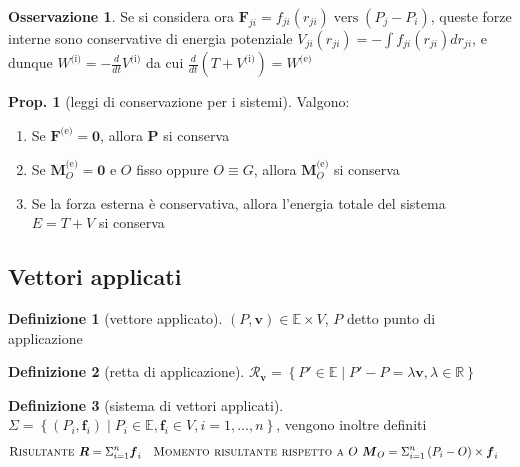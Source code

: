 \documentclass[a4paper,10pt]{article}
\theoremstyle{definition}
\DeclareMathOperator*{\vers}{vers}
\theoremstyle{indentdefinition}
\newtheorem{defn}{Definizione}[section]
\theoremstyle{indenttheorem}
\newtheorem{prop}{Prop.}
\theoremstyle{myremark}
\newtheorem*{rem*}{Osservazione}
\theoremstyle{indentgeneral}
\begin{document}
\begin{rem*}
Se si considera ora $\boldsymbol{F}_{ji}=f_{ji}\left(r_{ji}\right)\vers\left(P_{j}-P_{i}\right)$,
queste forze interne sono conservative di energia potenziale $V_{ji}\left(r_{ji}\right)=-\int f_{ji}\left(r_{ji}\right)dr_{ji}$,
e dunque $W^{\text{(i)}}=-\frac{d}{dt}V^{\text{(i)}}$ da cui $\frac{d}{dt}\left(T+V^{\text{(i)}}\right)=W^{\text{(e)}}$
\end{rem*}
\begin{prop}[leggi di conservazione per i sistemi]
\label{prop:leggi-conservazione-sistemi}Valgono:
\end{prop}

\begin{enumerate}
\item Se $\boldsymbol{F}^{\text{(e)}}=\boldsymbol{0}$, allora $\boldsymbol{P}$
si conserva
\item Se $\boldsymbol{M}_{O}^{\text{(e)}}=\boldsymbol{0}$ e $O$ fisso
oppure $O\equiv G$, allora $\boldsymbol{M}_{O}^{\text{(e)}}$ si
conserva
\item Se la forza esterna è conservativa, allora l'energia totale del sistema
$E=T+V$ si conserva
\end{enumerate}

\subsection{Vettori applicati}
\begin{defn}[vettore applicato]
\label{def:vettore-applicato}$\left(P,\boldsymbol{v}\right)\in\mathbb{E}\times V$,
$P$ detto punto di applicazione
\end{defn}

\begin{defn}[retta di applicazione]
\label{def:retta-di-applicazione}$\mathscr{R}_{\boldsymbol{v}}=\left\{ P'\in\mathbb{E}\mid P'-P=\lambda\boldsymbol{v},\lambda\in\mathbb{R}\right\} $
\end{defn}

\begin{defn}[sistema di vettori applicati]
\label{def:sistema-vettori-applicati}$\Sigma=\left\{ \left(P_{i},\boldsymbol{f}_{i}\right)\mid P_{i}\in\mathbb{E},\boldsymbol{f}_{i}\in V,i=1,\dots,n\right\} $,
vengono inoltre definiti
\begin{align*}
\text{\textsc{Risultante }} & \boldsymbol{R}=\Sigma_{i=1}^{n}\boldsymbol{f}_{i} & \text{\textsc{Momento risultante rispetto a \ensuremath{O} }} & \boldsymbol{M}_{O}=\Sigma_{i=1}^{n}\left(P_{i}-O\right)\times\boldsymbol{f}_{i}
\end{align*}
\end{defn}
\end{document}
